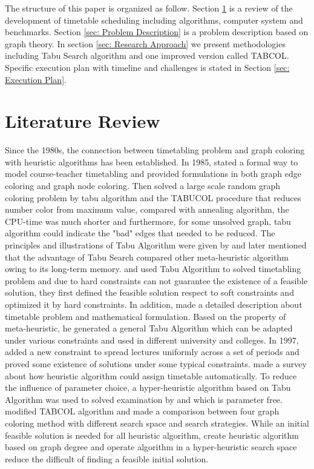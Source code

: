 \documentclass{article}
\begin{document}
The structure of this paper is organized as follow. Section \ref{sec: Literature Review} is a review of the development of timetable scheduling including algorithms, computer system and benchmarks. Section \ref{sec: Problem Description} is a problem description based on graph theory. In section \ref{sec: Research Approach} we present methodologies including Tabu Search algorithm and one improved version called TABCOL. Specific execution plan with timeline and challenges is stated in Section \ref{sec: Execution Plan}.

\newpage

\section{Literature Review}
\label{sec: Literature Review}

Since the 1980s, the connection between timetabling problem and graph coloring with heuristic algorithms has been established. In 1985, \citet{(werra1985)introduction} stated a formal way to model course-teacher timetabling and provided formulations in both graph edge coloring and graph node coloring. Then \cite{(hertz1987)using} solved a large scale random graph coloring problem by tabu algorithm and the TABUCOL procedure that reduces number color from maximum value, compared with annealing algorithm, the CPU-time was much shorter and furthermore, for some unsolved graph, tabu algorithm could indicate the "bad" edges that needed to be reduced. The principles and illustrations of Tabu Algorithm were given by \cite{(werra1989)tabu} and later \cite{(glover1990)tabu} mentioned that the advantage of Tabu Search compared other meta-heuristic algorithm owing to its long-term memory. \cite{(hertz1991)tabu} and \cite{(tuga2007)hybrid} used Tabu Algorithm to solved timetabling problem and due to hard constraints can not guarantee the existence of a feasible solution, they first defined the feasible solution respect to soft constraints and optimized it by hard constraints. In addition, \cite{(costa1994)tabu} made a detailed description about timetable problem and mathematical formulation. Based on the property of meta-heuristic, he generated a general Tabu Algorithm which can be adapted under various constraints and used in different university and colleges. In 1997, \cite{(werra1997)combinatorics} added a new constraint to spread lectures uniformly across a set of periods and proved some existence of solutions under some typical constraints. \cite{(schaerf1999)survey} made a survey about how heuristic algorithm could assign timetable automatically. To reduce the influence of parameter choice, a hyper-heuristic algorithm based on Tabu Algorithm was used to solved examination by \cite{(hussin2005)tabu} and \cite{(kendall2005)investigation} which is parameter free. \cite{(galinier2006)survey} modified TABCOL algorithm and made a comparison between four graph coloring method with different search space and search strategies. While an initial feasible solution is needed for all heuristic algorithm, \cite{(burke2007)graphbased} create heuristic algorithm based on graph degree and operate algorithm in a hyper-heuristic search space reduce the difficult of finding a feasible initial solution.
\end{document}
